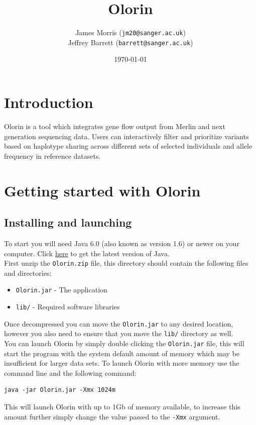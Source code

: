 \documentclass{article}
\title{Olorin}
\author{James Morris (\texttt{jm20@sanger.ac.uk})\\
Jeffrey Barrett (\texttt{barrett@sanger.ac.uk})}
\date{\today}
\begin{document}
\maketitle

\section{Introduction}

Olorin is a tool which integrates gene flow output from Merlin and next generation sequencing data. Users can interactively filter and prioritize variants based on haplotype sharing across different sets of selected individuals and allele frequency in reference datasets.

\section{Getting started with Olorin}
	\subsection{Installing and launching}
		To start you will need Java 6.0 (also known as version 1.6) or newer on your computer. Click \href{http://www.java.com/getjava/}{here} to get the latest version of Java.\\
		
		\noindent First unzip the \texttt{Olorin.zip} file, this directory should contain the following files and directories:
		\begin{itemize}
			\item{\texttt{Olorin.jar} - The application}
			\item{\texttt{lib/} - Required software libraries}
		\end{itemize}
		Once decompressed you can move the \texttt{Olorin.jar} to any desired location, however you also need to ensure that you move the \texttt{lib/} directory as well.\\

		\noindent You can launch Olorin by simply double clicking the \texttt{Olorin.jar} file, this will start the program with the system default amount of memory which may be insufficient for larger data sets. To launch Olorin with more memory use the command line and the following command:
\begin{verbatim}
java -jar Olorin.jar -Xmx 1024m 
\end{verbatim}
This will launch Olorin with up to 1Gb of memory available, to increase this amount further simply change the value passed to the \texttt{-Xmx} argument.
\end{document}
